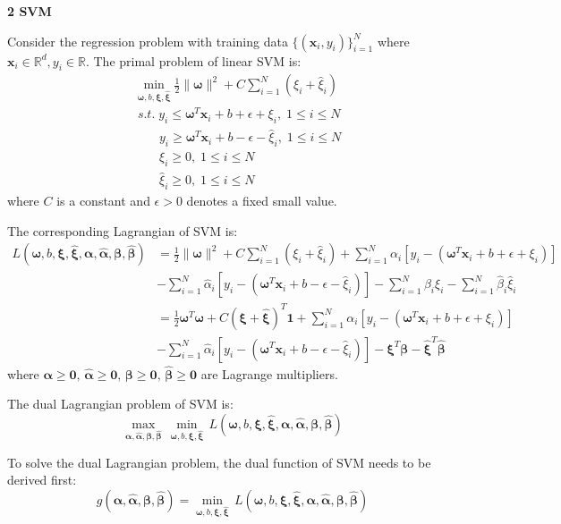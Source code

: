 \documentclass[12pt]{article}
\begin{document}
\bigskip
\bigskip
{\Large \bf 2 SVM}
\bigskip
\par
Consider the regression problem with training data $\{(\bm{x}_i, y_i)\}_{i=1}^N$ where $\bm{x}_i\in\mathbb{R}^d,y_i\in\mathbb{R}$. The primal problem of linear SVM is:
\begin{align*}
&\min_{\bm{\omega},b,\bm{\xi},\hat{\bm{\xi}}}\frac{1}{2}\|\bm{\omega}\|^2+C\sum_{i=1}^N\left(\xi_i+\hat{\xi}_i\right)\\
&\;s.t.\;y_i\leq\bm{\omega}^T\bm{x}_i+b+\epsilon+\xi_i,\;1\leq i \leq N \\
&\quad\quad y_i\geq\bm{\omega}^T\bm{x}_i+b-\epsilon-\hat{\xi}_i,\;1\leq i \leq N \\
&\quad\quad\xi_i\geq 0,\;1\leq i \leq N\\
&\quad\quad\hat{\xi}_i\geq 0,\;1\leq i \leq N 
\end{align*}
where $C$ is a constant and $\epsilon>0$ denotes a fixed small value.
\par
The corresponding Lagrangian of SVM is:
\begin{align*}
L(\bm{\omega},b,\bm{\xi},\hat{\bm{\xi}},\bm{\alpha},\hat{\bm{\alpha}},\bm{\beta},\hat{\bm{\beta}})&=\frac{1}{2}\|\bm{\omega}\|^2+C\sum_{i=1}^N\left(\xi_i+\hat{\xi}_i\right)+\sum_{i=1}^N\alpha_i\left[y_i-\left(\bm{\omega}^T\bm{x}_i+b+\epsilon+\xi_i\right)\right]\\
&-\sum_{i=1}^N\hat{\alpha}_i\left[y_i-\left(\bm{\omega}^T\bm{x}_i+b-\epsilon-\hat{\xi}_i\right)\right]-\sum_{i=1}^N\beta_i\xi_i-\sum_{i=1}^N\hat{\beta}_i\hat{\xi}_i\\
&=\frac{1}{2}\bm{\omega}^T\bm{\omega}+C\left(\bm{\xi}+\hat{\bm{\xi}}\right)^T\bm{1}+\sum_{i=1}^N\alpha_i\left[y_i-\left(\bm{\omega}^T\bm{x}_i+b+\epsilon+\xi_i\right)\right]\\
&-\sum_{i=1}^N\hat{\alpha}_i\left[y_i-\left(\bm{\omega}^T\bm{x}_i+b-\epsilon-\hat{\xi}_i\right)\right]-\bm{\xi}^T\bm{\beta}-\hat{\bm{\xi}}^T\hat{\bm{\beta}}
\end{align*}
where $\bm{\alpha}\geq\bm{0},\,\hat{\bm{\alpha}}\geq\bm{0},\,\bm{\beta}\geq\bm{0},\,\hat{\bm{\beta}}\geq\bm{0}$ are Lagrange multipliers.

\par
The dual Lagrangian problem of SVM is:
$$\max_{\bm{\alpha},\hat{\bm{\alpha}},\bm{\beta},\hat{\bm{\beta}}}\,\min_{\bm{\omega},b,\bm{\xi},\hat{\bm{\xi}}}\,L(\bm{\omega},b,\bm{\xi},\hat{\bm{\xi}},\bm{\alpha},\hat{\bm{\alpha}},\bm{\beta},\hat{\bm{\beta}})$$

To solve the dual Lagrangian problem, the dual function of SVM needs to be derived first:
$$g(\bm{\alpha},\hat{\bm{\alpha}},\bm{\beta},\hat{\bm{\beta}})=\min_{\bm{\omega},b,\bm{\xi},\hat{\bm{\xi}}}\,L(\bm{\omega},b,\bm{\xi},\hat{\bm{\xi}},\bm{\alpha},\hat{\bm{\alpha}},\bm{\beta},\hat{\bm{\beta}})$$
\end{document}
